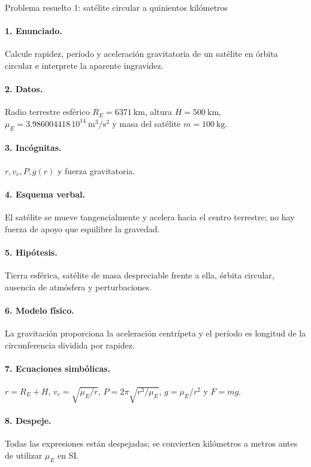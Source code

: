 \begin{studiumworked}{Problema resuelto 1: satélite circular a quinientos kilómetros}

\paragraph{1. Enunciado.} Calcule rapidez, período y aceleración gravitatoria de un satélite en órbita circular e interprete la aparente ingravidez.
\paragraph{2. Datos.} Radio terrestre esférico $R_E=6371\ \mathrm{km}$, altura $H=500\ \mathrm{km}$, $\mu_E=3.986004418\,10^{14}\ \mathrm{m^3/s^2}$ y masa del satélite $m=100\ \mathrm{kg}$.
\paragraph{3. Incógnitas.} $r,v_c,P,g(r)$ y fuerza gravitatoria.
\paragraph{4. Esquema verbal.} El satélite se mueve tangencialmente y acelera hacia el centro terrestre; no hay fuerza de apoyo que equilibre la gravedad.
\paragraph{5. Hipótesis.} Tierra esférica, satélite de masa despreciable frente a ella, órbita circular, ausencia de atmósfera y perturbaciones.
\paragraph{6. Modelo físico.} La gravitación proporciona la aceleración centrípeta y el período es longitud de la circunferencia dividida por rapidez.
\paragraph{7. Ecuaciones simbólicas.} $r=R_E+H$, $v_c=\sqrt{\mu_E/r}$, $P=2\pi\sqrt{r^3/\mu_E}$, $g=\mu_E/r^2$ y $F=mg$.
\paragraph{8. Despeje.} Todas las expresiones están despejadas; se convierten kilómetros a metros antes de utilizar $\mu_E$ en SI.

\end{studiumworked}
